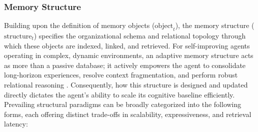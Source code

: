 \subsubsection{Memory Structure}
\label{sec:Memory_Structure}

Building upon the definition of memory objects ($\text{object}_t$), the memory structure ($\text{structure}_t$) specifies the organizational schema and relational topology through which these objects are indexed, linked, and retrieved. For self-improving agents operating in complex, dynamic environments, an adaptive memory structure acts as more than a passive database; it actively empowers the agent to consolidate long-horizon experiences, resolve context fragmentation, and perform robust relational reasoning \citep{zeng2024structuralmemoryllmagents}. Consequently, how this structure is designed and updated directly dictates the agent's ability to scale its cognitive baseline efficiently. Prevailing structural paradigms can be broadly categorized into the following  forms, each offering distinct trade-offs in scalability, expressiveness, and retrieval latency:


